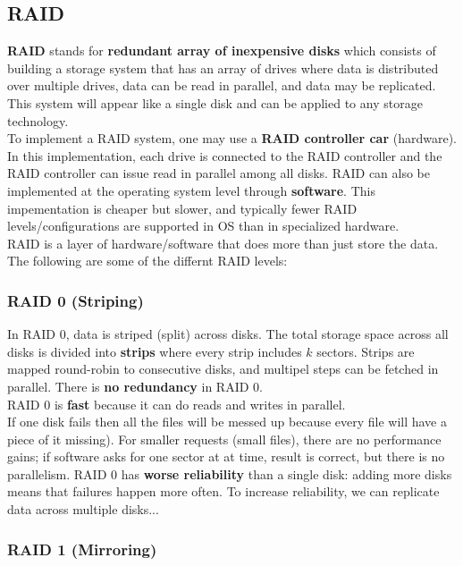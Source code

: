 \documentclass{article}
\newcommand{\bold}[1]{\textbf{#1}}
\begin{document}
\subsection{RAID}

\bold{RAID} stands for \bold{redundant array of inexpensive disks} which consists of building a storage system that has an array of drives where data is distributed over multiple drives, data can be read in parallel, and data may be replicated. This system will appear like a single disk and can be applied to any storage technology. \\ 

To implement a RAID system, one may use a \bold{RAID controller car} (hardware). In this implementation, each drive is connected to the RAID controller and the RAID controller can issue read in parallel among all disks. RAID can also be implemented at the operating system level through \bold{software}. This impementation is cheaper but slower, and typically fewer RAID levels/configurations are supported in OS than in specialized hardware. \\ 

RAID is a layer of hardware/software that does more than just store the data. The following are some of the differnt RAID levels:

\subsubsection{RAID 0 (Striping)}

In RAID 0, data is striped (split) across disks. The total storage space across all disks is divided into \bold{strips} where every strip includes $k$ sectors. Strips are mapped round-robin to consecutive disks, and multipel steps can be fetched in parallel. There is \bold{no redundancy} in RAID 0. \\ 

RAID 0 is \bold{fast} because it can do reads and writes in parallel. \\ 
If one disk fails then all the files will be messed up because every file will have a piece of it missing). For smaller requests (small files), there are no performance gains; if software asks for one sector at at time, result is correct, but there is no parallelism. RAID 0 has \bold{worse reliability} than a single disk: adding more disks means that failures happen more often. To increase reliability, we can replicate data across multiple disks...

\subsubsection{RAID 1 (Mirroring)}
\end{document}

